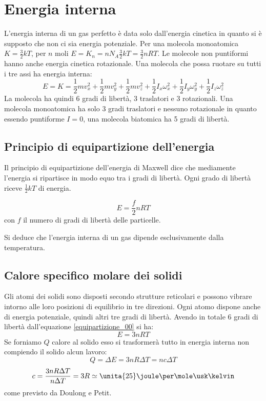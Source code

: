 \section{Energia interna}
L'energia interna di un gas perfetto è data solo dall'energia cinetica in quanto si è supposto che non ci sia energia potenziale. Per una molecola monoatomica $K=\frac{3}{2}kT$, per $n$ moli $E=K_n=nN_A\frac{3}{2}kT=\frac{3}{2}nRT$. Le molecole non puntiformi hanno anche energia cinetica rotazionale. Una molecola che possa ruotare su tutti i tre assi ha energia interna:
$$E=K=\frac{1}{2}mv_x^2+\frac{1}{2}mv_y^2+\frac{1}{2}mv_z^2+\frac{1}{2}I_x\omega_x^2+\frac{1}{2}I_y\omega_y^2+\frac{1}{2}I_z\omega_z^2$$
La molecola ha quindi 6 gradi di libertà, 3 traslatori e 3 rotazionali. Una molecola monoatomica ha solo 3 gradi traslatori e nessuno rotazionale in quanto essendo puntiforme $I=0$, una molecola biatomica ha 5 gradi di libertà.
\subsection{Principio di equipartizione dell'energia}
Il principio di equipartizione dell'energia di Maxwell dice che mediamente l'energia si ripartisce in modo equo tra i gradi di libertà. Ogni grado di libertà riceve $\frac{1}{2}kT$ di energia.
\begin{Pri}
\begin{equation}
E=\frac{f}{2}nRT
\label{equipartizione_00}
\end{equation}
con $f$ il numero di gradi di libertà delle particelle.
\end{Pri}
Si deduce che l'energia interna di un gas dipende esclusivamente dalla temperatura.
\subsection{Calore specifico molare dei solidi}
Gli atomi dei solidi sono disposti secondo strutture reticolari e possono vibrare intorno alle loro posizioni di equilibrio in tre direzioni. Ogni atomo dispone anche di energia potenziale, quindi altri tre gradi di libertà. Avendo in totale 6 gradi di libertà dall'equazione \eqref{equipartizione_00} si ha:
$$E=3nRT$$
Se forniamo $Q$ calore al solido esso si trasformerà tutto in energia interna non compiendo il solido alcun lavoro:
$$Q=\Delta E=3nR\Delta T=nc\Delta T$$
$$c=\frac{3nR\Delta T}{n\Delta T}=3R\simeq \unita{25}\joule\per\mole\usk\kelvin$$
come previsto da Doulong e Petit.
